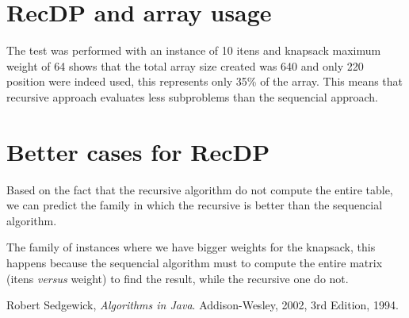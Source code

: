 \documentclass{article}
\begin{document}
\section{RecDP and array usage}

The test was performed with an instance of 10 itens and knapsack maximum weight of 64 shows that the total array size created was
640 and only 220 position were indeed used, this represents only 35\% of the array. This means that recursive approach evaluates
less subproblems than the sequencial approach.

\section{Better cases for RecDP}

Based on the fact that the recursive algorithm do not compute the entire table, we can predict the family in which the recursive is better
than the sequencial algorithm. 

The family of instances where we have bigger weights for the knapsack, this happens
because the sequencial algorithm must to compute the entire matrix (itens \textit{versus} weight) to find the result, while the recursive one
do not.

\begin{thebibliography}{9}

  Robert Sedgewick,
  \emph{Algorithms in Java}.
  Addison-Wesley, 2002,
  3rd Edition,
  1994.

\end{thebibliography}
\end{document}
